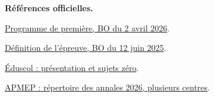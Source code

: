 \textbf{Références officielles.}\par
\href{https://www.education.gouv.fr/bo/2026/Hebdo14/MENE2602917A}{Programme de première, BO du 2 avril 2026}.\par
\href{https://www.education.gouv.fr/bo/2025/Hebdo24/MENE2515469N}{Définition de l’épreuve, BO du 12 juin 2025}.\par
\href{https://eduscol.education.gouv.fr/5688/epreuve-anticipee-de-mathematiques-aux-baccalaureats-general-et-technologique}{Éduscol : présentation et sujets zéro}.\par
\href{https://www.apmep.fr/Epreuve-anticipee-2026}{APMEP : répertoire des annales 2026, plusieurs centres}.
\tableofcontents
\mxnewpage
